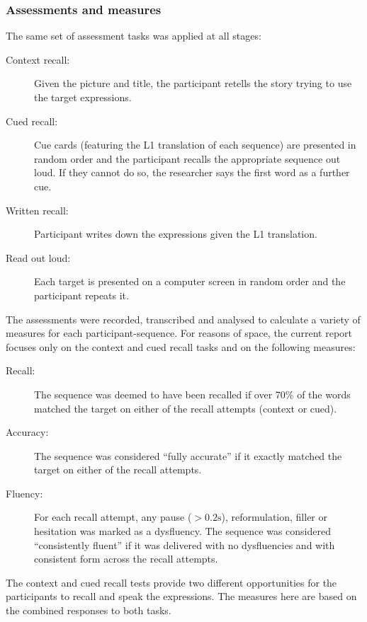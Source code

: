 \documentclass[output=paper]{langscibook}
\begin{document}
\subsubsection{Assessments and measures}\label{sec:cutler:2.2.4}

The same set of assessment tasks was applied at all stages:

\begin{description}
\item[Context recall:] Given the picture and title, the participant retells the story trying to use the target expressions. 
\item[Cued recall:] Cue cards (featuring the L1 translation of each sequence) are presented in random order and the participant recalls the appropriate sequence out loud. If they cannot do so, the researcher says the first word as a further cue. 
\item[Written recall:] Participant writes down the expressions given the L1 translation.
\item[Read out loud:] Each target is presented on a computer screen in random order and the participant repeats it.
\end{description}

The assessments were recorded, transcribed and analysed to calculate a variety of measures for each participant-sequence. For reasons of space, the current report focuses only on the context and cued recall tasks and on the following measures:

\begin{description}
\item [Recall:] The sequence was deemed to have been recalled if over 70\% of the words matched the target on either of the recall attempts (context or cued). 
\item [Accuracy:] The sequence was considered ``fully accurate'' if it exactly matched the target on either of the recall attempts. 
\item [Fluency:] For each recall attempt, any pause ($>0.2\text{s}$), reformulation, filler or hesitation was marked as a dysfluency. The sequence was considered ``consistently fluent'' if it was delivered with no dysfluencies and with consistent form across the recall attempts. 
\end{description}

The context and cued recall tests provide two different opportunities for the participants to recall and speak the expressions. The measures here are based on the combined responses to both tasks.
\end{document}
